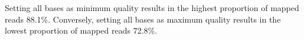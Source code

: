 \documentclass{bioinfo}
\begin{document}
Setting all bases as minimum quality results in the highest proportion
of mapped reads 88.1\%. Conversely, setting all bases as maximum
quality results in the lowest proportion of mapped reads 72.8\%.




\end{document}

